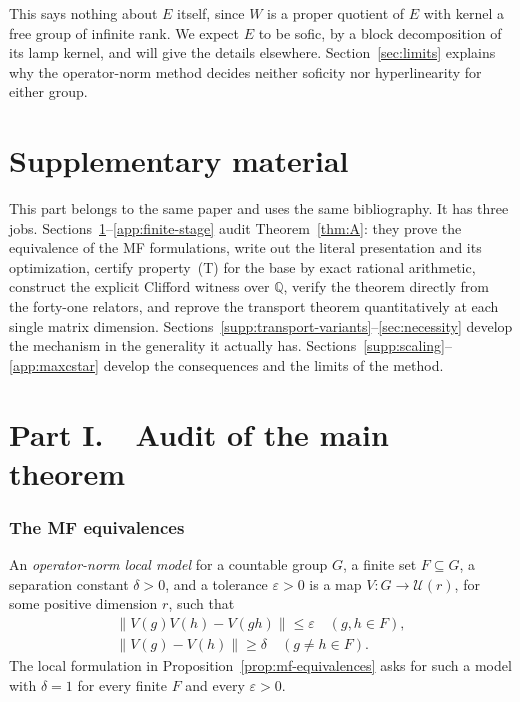 \documentclass[11pt]{amsart}
\theoremstyle{definition}
\theoremstyle{remark}
\theoremstyle{plain}
\newcommand{\U}{\mathcal U}
\newcommand{\opnorm}[1]{\left\lVert #1\right\rVert}
\begin{document}
This says nothing about $E$ itself, since $W$ is a proper quotient of
$E$ with kernel a free group of infinite rank.  We expect $E$ to be
sofic, by a block decomposition of its lamp kernel, and will give the
details elsewhere.  Section~\ref{sec:limits} explains why the
operator-norm method decides neither soficity nor hyperlinearity for
either group.

\clearpage
\part*{Supplementary material}
\setcounter{section}{0}
\renewcommand{\thesection}{S\arabic{section}}
\providecommand{\theHsection}{}
\renewcommand{\theHsection}{supp.\arabic{section}}
\renewcommand{\thepage}{S\arabic{page}}
\setcounter{page}{1}

\bigskip
\noindent
This part belongs to the same paper and uses the same bibliography.  It has
three jobs.  Sections~\ref{app:equivalences}--\ref{app:finite-stage} audit
Theorem~\ref{thm:A}: they prove the equivalence of the MF formulations, write
out the literal presentation and its optimization, certify
property~\textup{(T)} for the base by exact rational arithmetic, construct the
explicit Clifford witness over $\mathbb Q$, verify the theorem directly from
the forty-one relators, and reprove the transport theorem quantitatively at
each single matrix dimension.
Sections~\ref{supp:transport-variants}--\ref{sec:necessity} develop the
mechanism in the generality it actually has.
Sections~\ref{supp:scaling}--\ref{app:maxcstar} develop the consequences and
the limits of the method.


\part*{Part I.\ \ Audit of the main theorem}

\section{The MF equivalences}\label{app:equivalences}

An \emph{operator-norm local model} for a countable group $G$, a finite
set $F\subseteq G$, a separation constant $\delta>0$, and a tolerance
$\varepsilon>0$ is a map $V\colon G\to\U(r)$, for some positive
dimension $r$, such that
\begin{gather*}
 \opnorm{V(g)V(h)-V(gh)}\le\varepsilon\quad(g,h\in F),\\
 \opnorm{V(g)-V(h)}\ge\delta\quad(g\ne h\in F).
\end{gather*}
The local formulation in Proposition~\ref{prop:mf-equivalences} asks for
such a model with $\delta=1$ for every finite $F$ and every
$\varepsilon>0$.
\end{document}
